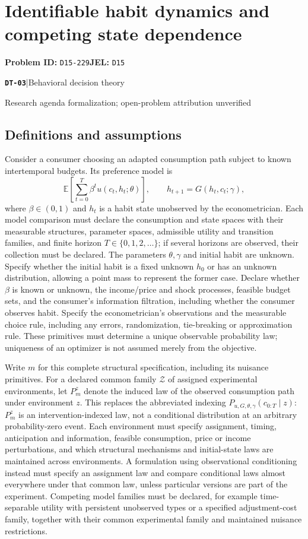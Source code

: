 \documentclass[11pt,a4paper]{article}
\newcommand{\E}{\mathbb E}
\newcommand{\entrymeta}[3]{{\sffamily\small\color{muted}\textbf{\texttt{#1}}\quad|\quad #2\par #3\par}}
\begin{document}
\section*{Identifiable habit dynamics and competing state dependence}
\textbf{Problem ID:} \texttt{D15-229}\quad \textbf{JEL:} \texttt{D15}\par
\label{problem:OP-0588}
\label{beyond:DT-03}
\entrymeta{DT-03}{Behavioral decision theory}{Research agenda formalization; open-problem attribution unverified}
\subsection*{Definitions and assumptions}
Consider a consumer choosing an adapted consumption path subject to known intertemporal budgets. Its preference model is
\[
 \E\left[\sum_{t=0}^{T}\beta^tu(c_t,h_t;\theta)\right],\qquad
 h_{t+1}=G(h_t,c_t;\gamma),
\]
where $\beta\in(0,1)$ and $h_t$ is a habit state unobserved by the econometrician. Each model comparison must declare the consumption and state spaces with their measurable structures, parameter spaces, admissible utility and transition families, and finite horizon $T\in\{0,1,2,\ldots\}$; if several horizons are observed, their collection must be declared. The parameters $\theta,\gamma$ and initial habit are unknown. Specify whether the initial habit is a fixed unknown $h_0$ or has an unknown distribution, allowing a point mass to represent the former case. Declare whether $\beta$ is known or unknown, the income/price and shock processes, feasible budget sets, and the consumer's information filtration, including whether the consumer observes habit. Specify the econometrician's observations and the measurable choice rule, including any errors, randomization, tie-breaking or approximation rule. These primitives must determine a unique observable probability law; uniqueness of an optimizer is not assumed merely from the objective.

Write $m$ for this complete structural specification, including its nuisance primitives. For a declared common family $\mathcal Z$ of assigned experimental environments, let $P_m^z$ denote the induced law of the observed consumption path under environment $z$. This replaces the abbreviated indexing $P_{u,G,\theta,\gamma}(c_{0:T}\mid z)$: $P_m^z$ is an intervention-indexed law, not a conditional distribution at an arbitrary probability-zero event. Each environment must specify assignment, timing, anticipation and information, feasible consumption, price or income perturbations, and which structural mechanisms and initial-state laws are maintained across environments. A formulation using observational conditioning instead must specify an assignment law and compare conditional laws almost everywhere under that common law, unless particular versions are part of the experiment. Competing model families must be declared, for example time-separable utility with persistent unobserved types or a specified adjustment-cost family, together with their common experimental family and maintained nuisance restrictions.
\end{document}
